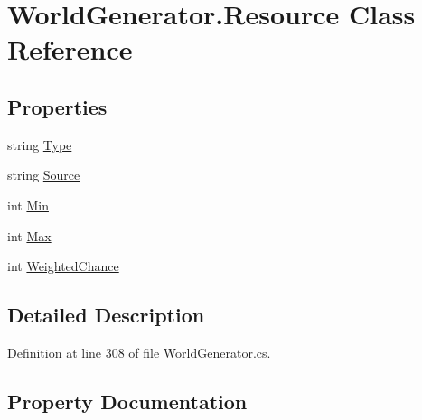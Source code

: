 \hypertarget{class_world_generator_1_1_resource}{}\section{World\+Generator.\+Resource Class Reference}
\label{class_world_generator_1_1_resource}
\subsection*{Properties}
\begin{DoxyCompactItemize}
\item 
string \hyperlink{class_world_generator_1_1_resource_a6cf3342742f365965608d238c6c0b91b}{Type}
\item 
string \hyperlink{class_world_generator_1_1_resource_ac3a91846d77433958b941b038ac233e9}{Source}
\item 
int \hyperlink{class_world_generator_1_1_resource_a965681209cb3b0d84c21f3b6d10b0fa8}{Min}
\item 
int \hyperlink{class_world_generator_1_1_resource_a05d90c102ebccddc4f7c9cc2c2f7ed3d}{Max}
\item 
int \hyperlink{class_world_generator_1_1_resource_a8f0af5ce2c0a6f288588e6c5ad21695e}{Weighted\+Chance}
\end{DoxyCompactItemize}


\subsection{Detailed Description}


Definition at line 308 of file World\+Generator.\+cs.



\subsection{Property Documentation}
\mbox{\label{class_world_generator_1_1_resource_a05d90c102ebccddc4f7c9cc2c2f7ed3d}} 
